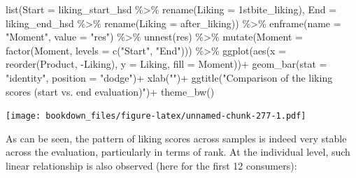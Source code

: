 \documentclass[
]{krantz}
\makeatletter
\newenvironment{Shaded}{\begin{snugshade}}{\end{snugshade}}
\newcommand{\AttributeTok}[1]{\textcolor[rgb]{0.61,0.61,0.61}{#1}}
\newcommand{\FunctionTok}[1]{\textcolor[rgb]{0,0,0}{#1}}
\newcommand{\NormalTok}[1]{#1}
\newcommand{\SpecialCharTok}[1]{\textcolor[rgb]{0,0,0}{#1}}
\newcommand{\StringTok}[1]{\textcolor[rgb]{0.5,0.5,0.5}{#1}}
\newenvironment{kframe}{%
\medskip{}
\setlength{\fboxsep}{.8em}
 \def\at@end@of@kframe{}%
 \ifinner\ifhmode%
  \def\at@end@of@kframe{\end{minipage}}%
  \begin{minipage}{\columnwidth}%
 \fi\fi%
 \def\FrameCommand##1{\hskip\@totalleftmargin \hskip-\fboxsep
 \colorbox{shadecolor}{##1}\hskip-\fboxsep
     \hskip-\linewidth \hskip-\@totalleftmargin \hskip\columnwidth}%
 \MakeFramed {\advance\hsize-\width
   \@totalleftmargin\z@ \linewidth\hsize
   \@setminipage}}%
 {\par\unskip\endMakeFramed%
 \at@end@of@kframe}
\renewenvironment{Shaded}{\begin{kframe}}{\end{kframe}}
\makeatother
\begin{document}
\begin{Shaded}
\begin{Highlighting}[]
\FunctionTok{list}\NormalTok{(}\AttributeTok{Start =}\NormalTok{ liking\_start\_hsd }\SpecialCharTok{\%\textgreater{}\%} \FunctionTok{rename}\NormalTok{(}\AttributeTok{Liking =} \StringTok{\textasciigrave{}}\AttributeTok{1stbite\_liking}\StringTok{\textasciigrave{}}\NormalTok{),}
     \AttributeTok{End =}\NormalTok{ liking\_end\_hsd }\SpecialCharTok{\%\textgreater{}\%} \FunctionTok{rename}\NormalTok{(}\AttributeTok{Liking =} \StringTok{\textasciigrave{}}\AttributeTok{after\_liking}\StringTok{\textasciigrave{}}\NormalTok{)) }\SpecialCharTok{\%\textgreater{}\%}
  \FunctionTok{enframe}\NormalTok{(}\AttributeTok{name =} \StringTok{"Moment"}\NormalTok{, }\AttributeTok{value =} \StringTok{"res"}\NormalTok{) }\SpecialCharTok{\%\textgreater{}\%}
  \FunctionTok{unnest}\NormalTok{(res) }\SpecialCharTok{\%\textgreater{}\%}
  \FunctionTok{mutate}\NormalTok{(}\AttributeTok{Moment =} \FunctionTok{factor}\NormalTok{(Moment, }\AttributeTok{levels =} \FunctionTok{c}\NormalTok{(}\StringTok{"Start"}\NormalTok{, }\StringTok{"End"}\NormalTok{))) }\SpecialCharTok{\%\textgreater{}\%}
  \FunctionTok{ggplot}\NormalTok{(}\FunctionTok{aes}\NormalTok{(}\AttributeTok{x =} \FunctionTok{reorder}\NormalTok{(Product, }\SpecialCharTok{{-}}\NormalTok{Liking), }\AttributeTok{y =}\NormalTok{ Liking, }\AttributeTok{fill =}\NormalTok{ Moment))}\SpecialCharTok{+}
  \FunctionTok{geom\_bar}\NormalTok{(}\AttributeTok{stat =} \StringTok{"identity"}\NormalTok{, }\AttributeTok{position =} \StringTok{"dodge"}\NormalTok{)}\SpecialCharTok{+}
  \FunctionTok{xlab}\NormalTok{(}\StringTok{""}\NormalTok{)}\SpecialCharTok{+}
  \FunctionTok{ggtitle}\NormalTok{(}\StringTok{"Comparison of the liking scores (start vs. end evaluation)"}\NormalTok{)}\SpecialCharTok{+}
  \FunctionTok{theme\_bw}\NormalTok{()}
\end{Highlighting}
\end{Shaded}

\texttt{[image: bookdown\_files/figure-latex/unnamed-chunk-277-1.pdf]}

As can be seen, the pattern of liking scores across samples is indeed very stable across the evaluation, particularly in terms of rank. At the individual level, such linear relationship is also observed (here for the first 12 consumers):
\end{document}

